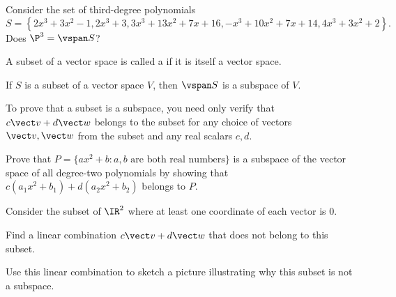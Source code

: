 \begin{applicationActivities}{4}{10}
\begin{activity}{10}
  Consider the set of third-degree polynomials \[S=\left\{
  2x^3+3x^2-1,
  2x^3+3,
  3x^3+13x^2+7x+16,
  -x^3+10x^2+7x+14,
  4x^3+3x^2+2
  \right\}
  .\]
  Does
  \(\P^3=\vspan S\)?
\end{activity}

\begin{definition}
  A subset of a vector space is called a  if it is
  itself a vector space.
\end{definition}

\begin{fact}
  If \(S\) is a subset of a vector space \(V\), then
  \(\vspan S\) is a subspace of \(V\).
\end{fact}

\begin{remark}
  To prove that a subset is a subspace, you need only verify that
  \(c\vect v+d\vect w\) belongs to the subset for any choice of
  vectors \(\vect v,\vect w\) from the subset and any real scalars \(c,d\).
\end{remark}

\begin{activity}{5}
  Prove that \(P=\{ax^2+b:a,b\text{ are both real numbers}\}\) is a subspace
  of the vector space of all degree-two polynomials by showing that
  \(c(a_1x^2+b_1)+d(a_2x^2+b_2)\) belongs to \(P\).
\end{activity}

\begin{activity}{10}
  Consider the subset of \(\IR^2\) where at least one coordinate of
  each vector is \(0\).
  \begin{center}
  \end{center}
    Find a linear combination
    \(c\vect v+
    d\vect w\) that does not
    belong to this subset.
  \begin{TBLnote}
    Use this linear combination to sketch a picture
    illustrating why this subset is not
    a subspace.
  \end{TBLnote}
\end{activity}


\end{applicationActivities}
